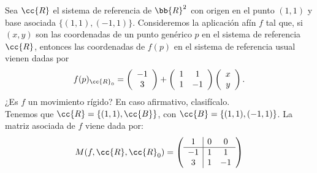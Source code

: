 \begin{ejercicio}
    Sea $\cc{R}$ el sistema de referencia de $\bb{R}^2$ con origen en el punto $(1, 1)$ y base asociada $\{(1, 1),(-1, 1)\}$. Consideremos la aplicación afín $f$ tal que, si $(x, y)$ son las coordenadas de un punto genérico $p$ en el sistema de referencia $\cc{R}$, entonces las coordenadas de $f(p)$ en el sistema de referencia usual vienen dadas por
    \begin{equation*}
        f(p)_{\cc{R}_0}=\left(\begin{array}{c}
            -1 \\ 3
        \end{array}\right)+
        \left(\begin{array}{cc}
            1 & 1 \\ 1 & -1
        \end{array}\right)
        \left(\begin{array}{c}
            x \\ y
        \end{array}\right).
    \end{equation*}
    ¿Es $f$ un movimiento rígido? En caso afirmativo, clasifícalo.\\

    Tenemos que $\cc{R}=\{(1,1), \cc{B}\}$, con $\cc{B} = \{(1, 1),(-1, 1)\}$. La matriz asociada de $f$ viene dada por:
    \begin{equation*}
        M(f, \cc{R}, \cc{R}_0) = \left(\begin{array}{c|cc}
            1 & 0 & 0 \\ \hline
            -1 & 1 & 1 \\
            3 & 1 & -1
        \end{array}\right)
    \end{equation*}


\end{ejercicio}
